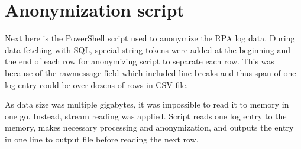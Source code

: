 

\section{Anonymization script}\label{sec:app-anonymization-script}

Next here is the PowerShell script used
to anonymize the RPA log data.
During data fetching with SQL,
special string tokens were added at the beginning and the end of each row
for anonymizing script to separate each row.
This was because of the rawmessage-field
which included line breaks
and thus span of one log entry could be over dozens of rows in CSV file.

As data size was multiple gigabytes,
it was impossible to read it to memory in one go.
Instead,
stream reading was applied.
Script reads one log entry to the memory,
makes necessary processing and anonymization,
and outputs the entry in one line to output file
before reading the next row.

